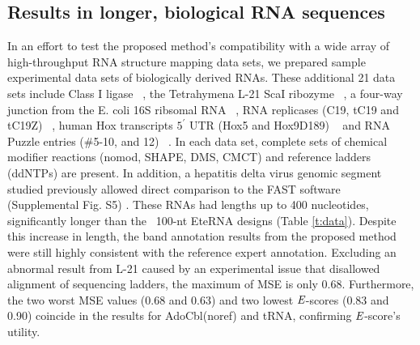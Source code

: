 \subsection{Results in longer, biological RNA sequences}
In an effort to test the proposed method's compatibility with a wide array of high-throughput RNA structure mapping data sets, we prepared sample experimental data sets of biologically derived RNAs. These additional 21 data sets include Class I ligase ~\citep{Bagby01122009}, the Tetrahymena L-21 ScaI ribozyme ~\citep{russell2006}, a four-way junction from the E. coli 16S ribsomal RNA ~\citep{tian2014nature}, RNA replicases (C19, tC19 and tC19Z) ~\citep{Wochner08042011}, human Hox transcripts $5^\prime$ UTR (Hox5 and Hox9D189) ~\citep{xue2014} and RNA Puzzle entries (\#5-10, and 12) ~\citep{Cruz01042012}. In each data set, complete sets of chemical modifier reactions (nomod, SHAPE, DMS, CMCT) and reference ladders (ddNTPs) are present. In addition, a hepatitis delta virus genomic segment studied previously allowed direct comparison to the FAST software (Supplemental Fig. S5) \citep{Pang2011}. These RNAs had lengths up to 400 nucleotides, significantly longer than the ~100-nt EteRNA designs (Table \ref{t:data}). Despite this increase in length, the band annotation results from the proposed method were still highly consistent with the reference expert annotation. Excluding an abnormal result from L-21 caused by an experimental issue that disallowed alignment of sequencing ladders, the maximum of MSE is only 0.68. Furthermore, the two worst MSE values (0.68 and 0.63) and two lowest ${\emph{E}}$-scores (0.83 and 0.90) coincide in the results for AdoCbl(noref) and tRNA, confirming ${\emph{E}}$-score's utility. 

